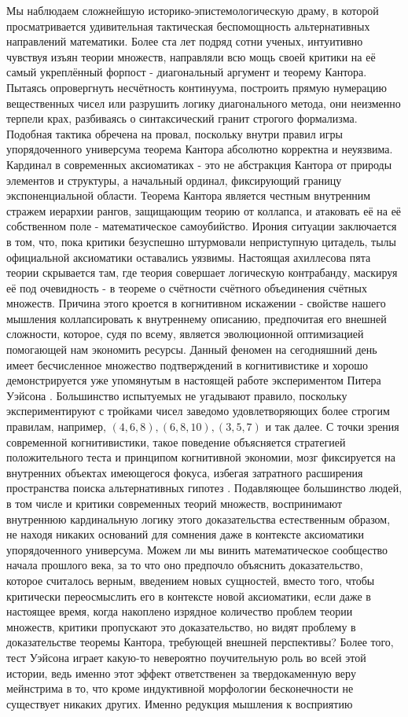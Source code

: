 \documentclass[12pt]{article}
\begin{document}
Мы наблюдаем сложнейшую историко-эпистемологическую драму, в которой просматривается удивительная тактическая беспомощность альтернативных направлений математики. Более ста лет подряд сотни ученых, интуитивно чувствуя изъян теории множеств, направляли всю мощь своей критики на её самый укреплённый форпост - диагональный аргумент и теорему Кантора. Пытаясь опровергнуть несчётность континуума, построить прямую нумерацию вещественных чисел или разрушить логику диагонального метода, они неизменно терпели крах, разбиваясь о синтаксический гранит строгого формализма. Подобная тактика обречена на провал, поскольку внутри правил игры упорядоченного универсума теорема Кантора абсолютно корректна и неуязвима. Кардинал в современных аксиоматиках - это не абстракция Кантора от природы элементов и структуры, а начальный ординал, фиксирующий границу экспоненциальной области. Теорема Кантора является честным внутренним стражем иерархии рангов, защищающим теорию от коллапса, и атаковать её на её собственном поле - математическое самоубийство. Ирония ситуации заключается в том, что, пока критики безуспешно штурмовали неприступную цитадель, тылы официальной аксиоматики оставались уязвимы. Настоящая ахиллесова пята теории скрывается там, где теория совершает логическую контрабанду, маскируя её под очевидность - в теореме о счётности счётного объединения счётных множеств. Причина этого кроется в когнитивном искажении - свойстве нашего мышления коллапсировать к внутреннему описанию, предпочитая его внешней сложности, которое, судя по всему, является эволюционной оптимизацией помогающей нам экономить ресурсы. Данный феномен на сегодняшний день имеет бесчисленное множество подтверждений в когнитивистике и хорошо демонстрируется уже упомянутым в настоящей работе экспериментом Питера Уэйсона \cite{wason-246}. Большинство испытуемых не угадывают правило, поскольку экспериментируют с тройками чисел заведомо удовлетворяющих более строгим правилам, например, $(4, 6, 8), (6, 8, 10), (3, 5, 7)$ и так далее. С точки зрения современной когнитивистики, такое поведение объясняется стратегией положительного теста и принципом когнитивной экономии, мозг фиксируется на внутренних объектах имеющегося фокуса, избегая затратного расширения пространства поиска альтернативных гипотез \cite{positive-test, rational-selection}. Подавляющее большинство людей, в том числе и критики современных теорий множеств, воспринимают внутреннюю кардинальную логику этого доказательства естественным образом, не находя никаких оснований для сомнения даже в контексте аксиоматики упорядоченного универсума. Можем ли мы винить математическое сообщество начала прошлого века, за то что оно предпочло объяснить доказательство, которое считалось верным, введением новых сущностей, вместо того, чтобы критически переосмыслить его в контексте новой аксиоматики, если даже в настоящее время, когда накоплено изрядное количество проблем теории множеств, критики пропускают это доказательство, но видят проблему в доказательстве теоремы Кантора, требующей внешней перспективы? Более того, тест Уэйсона играет какую-то невероятно поучительную роль во всей этой истории, ведь именно этот эффект ответственен за твердокаменную веру мейнстрима в то, что кроме индуктивной морфологии бесконечности не существует никаких других. Именно редукция мышления к восприятию 
\end{document}
